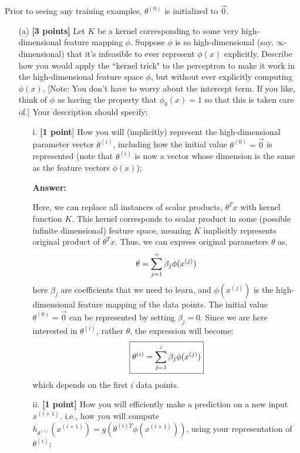 \documentclass{article}
\begin{document}
Prior to seeing any training examples, $\theta^{(0)}$ is initialized to $\vec{0}$.

\begin{enumerate}
  \item[(a)] \textbf{[3 points]} Let $K$ be a kernel corresponding to some very high-dimensional feature mapping $\phi$. Suppose $\phi$ is so high-dimensional (say, $\infty$-dimensional) that it's infeasible to ever represent $\phi(x)$ explicitly. Describe how you would apply the ``kernel trick" to the perceptron to make it work in the high-dimensional feature space $\phi$, but without ever explicitly computing $\phi(x)$. [Note: You don't have to worry about the intercept term. If you like, think of $\phi$ as having the property that $\phi_0(x) = 1$ so that this is taken care of.] Your description should specify:
  \begin{enumerate}
    \item[i.] \textbf{[1 point}] How you will (implicitly) represent the high-dimensional parameter vector $\theta^{(i)}$, including how the initial value $\theta^{(0)} = \vec{0}$ is represented (note that $\theta^{(i)}$ is now a vector whose dimension is the same as the feature vectors $\phi(x)$);

    \textbf{Answer:}


  Here, we can replace all instances of scalar products, $\theta^T x$ with kernel function $K$. This kernel corresponds to scalar product in some (possible infinite dimensional) feature space, meaning $K$ implicitly represents original product of $\theta^T x$. Thus, we can express original parameters $\theta$ as,
   \begin{align*}
     \theta = \sum_{j=1}^{{\color{red}n}}\beta_j\phi(x^{(j)}) 
   \end{align*}
   here $\beta_j$ are coefficients that we need to learn, and $\phi(x^{(j)})$ is the high-dimensional feature mapping of the data points. The initial value 
$\theta^{(0)} = \vec{0}$ can be represented by setting $\beta_j = 0$.
Since we are here interested in $
\theta^{(i)}$, rather $\theta$, the expression will become:
\[
\boxed{ \theta^{(i)} = \sum_{j=1}^{{\color{red}i}}\beta_j\phi(x^{(j)})}
\]
which  depends on the first 
$i$ data points.


    \item[ii.] \textbf{[1 point]} How you will efficiently make a prediction on a new input $x^{(i+1)}$. i.e., how you will compute $h_{\theta^{(i)}} (x^{(i+1)}) = g(\theta^{(i)T} \phi(x^{(i+1)}))$, using your representation of $\theta^{(i)}$;


\end{enumerate}
\end{enumerate}
\end{document}
